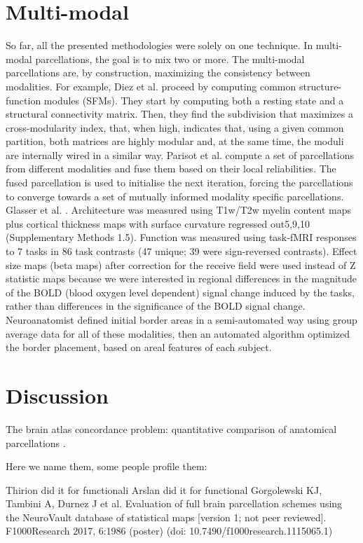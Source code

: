 \section{Multi-modal}
So far, all the presented methodologies were solely on one technique. In multi-modal parcellations, the goal is to mix two or more.
The multi-modal parcellations are, by construction, maximizing the consistency between modalities. For example,
Diez et al. \cite{Diez2014} proceed by computing common structure-function modules (SFMs). They start by computing both a resting state and a structural connectivity matrix. Then, they find the subdivision that maximizes a cross-modularity index, that, when high, indicates that, using a given common partition, both matrices are highly modular and, at the same time, the moduli are internally wired in a similar way.
Parisot et al. \cite{Parisot2017} compute a set of parcellations from different modalities and fuse them based on their local reliabilities. The fused parcellation is used to initialise the next iteration, forcing the parcellations to converge towards a set of mutually informed modality specific parcellations.
Glasser et al. \cite{Glasser2016}. Architecture was measured using T1w/T2w myelin content maps plus cortical thickness maps with surface curvature regressed out5,9,10 (Supplementary Methods 1.5). Function was measured using task-fMRI responses to 7 tasks in 86 task contrasts (47 unique; 39 were sign-reversed contrasts). Effect size maps (beta maps) after correction for the receive field were used instead of Z statistic maps because we were interested in regional differences in the magnitude of the BOLD (blood oxygen level dependent) signal change induced by the tasks, rather than differences in the significance of the BOLD signal change. Neuroanatomist defined initial border areas in a semi-automated way using group average data for all of these modalities, then an automated algorithm optimized the border placement, based on areal features of each subject.

\section{Discussion}
The brain atlas concordance problem: quantitative comparison of anatomical parcellations \cite{Bohland2009}.


Here we name them, some people profile them:

Thirion did it for functionali \cite{Thirion2014}
Arslan did it for functional \cite{Arslan2018}
Gorgolewski KJ, Tambini A, Durnez J et al. Evaluation of full brain parcellation schemes using the NeuroVault database of statistical maps [version 1; not peer reviewed]. F1000Research 2017, 6:1986 (poster) (doi: 10.7490/f1000research.1115065.1) 

